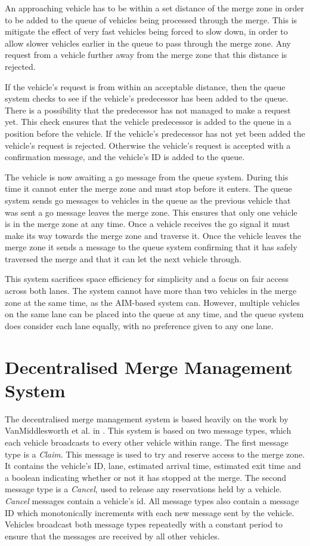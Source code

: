 An approaching vehicle has to be within a set distance of the merge zone in order to be added to the queue of vehicles being processed through the merge. This is mitigate the effect of very fast vehicles being forced to slow down, in order to allow slower vehicles earlier in the queue to pass through the merge zone. Any request from a vehicle further away from the merge zone that this distance is rejected.

If the vehicle's request is from within an acceptable distance, then the queue system checks to see if the vehicle's predecessor has been added to the queue. There is a possibility that the predecessor has not managed to make a request yet. This check ensures that the vehicle predecessor is added to the queue in a position before the vehicle. If the vehicle's predecessor has not yet been added the vehicle's request is rejected. Otherwise the vehicle's request is accepted with a confirmation message, and the vehicle's ID is added to the queue.

The vehicle is now awaiting a go message from the queue system. During this time it cannot enter the merge zone and must stop before it enters. The queue system sends go messages to vehicles in the queue as the previous vehicle that was sent a go message leaves the merge zone. This ensures that only one vehicle is in the merge zone at any time. Once a vehicle receives the go signal it must make its way towards the merge zone and traverse it. Once the vehicle leaves the merge zone it sends a message to the queue system confirming that it has safely traversed the merge and that it can let the next vehicle through.

This system sacrifices space efficiency for simplicity and a focus on fair access across both lanes. The system cannot have more than two vehicles in the merge zone at the same time, as the AIM-based system can. However, multiple vehicles on the same lane can be placed into the queue at any time, and the queue system does consider each lane equally, with no preference given to any one lane.

\section{Decentralised Merge Management System}
\label{sec:Decentralised Merge Management System}
The decentralised merge management system is based heavily on the work by VanMiddlesworth et al. in  \citep{VanMiddlesworth2008}. This system is based on two message types, which each vehicle broadcasts to every other vehicle within range. The first message type is a \emph{Claim}. This message is used to try and reserve access to the merge zone. It contains the vehicle's ID, lane, estimated arrival time, estimated exit time and a boolean indicating whether or not it has stopped at the merge. The second message type is a \emph{Cancel}, used to release any reservations held by a vehicle. \emph{Cancel} messages contain a vehicle's id. All message types also contain a message ID which monotonically increments with each new message sent by the vehicle. Vehicles broadcast both message types repeatedly with a constant period to ensure that the messages are received by all other vehicles. 

